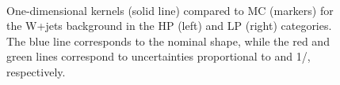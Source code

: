 \begin{figure}[h]
\centering
{}
\\
\caption{One-dimensional \MVV kernels (solid line) compared to MC (markers) for the W+jets background in the HP (left) and LP (right) categories. The blue line corresponds to the nominal shape, while the red and green lines correspond to uncertainties proportional to \MVV and 1/\MVV, respectively.}
\label{fig:Vjets_mvv}
\end{figure}
